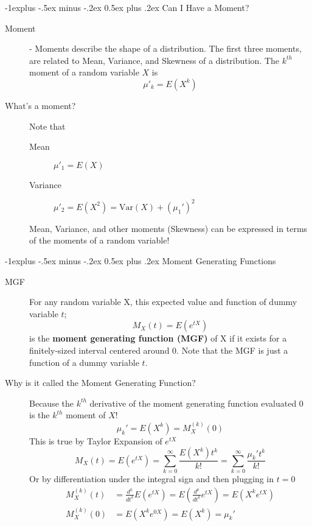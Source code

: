 \documentclass[10pt,landscape]{article}
\makeatletter
\theoremstyle{definition}
\newcommand{\var}{\textrm{Var}}
\renewcommand{\subsection}{\@startsection{subsection}{2}{0mm}%
                                {-1explus -.5ex minus -.2ex}%
                                {0.5ex plus .2ex}%
                                {\normalfont\normalsize\bfseries}}
\makeatother
\begin{document}
\begin{multicols}{3}
\subsection{Can I Have a Moment?}
\begin{description}
\item[Moment] - Moments describe the shape of a distribution. The first three moments, are related to Mean, Variance, and Skewness of a distribution. The $k^{th}$ moment of a random variable $X$ is
    \[\mu'_k = E(X^k)\]
\item[What's a moment?] Note that 
    \begin{description}
        \item[Mean] $\mu'_1 = E(X)$
        \item[Variance] $\mu'_2 = E(X^2) = \var(X) + (\mu_1')^2$
    \end{description}
    Mean, Variance, and other moments (Skewness) can be expressed in terms of the moments of a random variable!
\end{description}

\subsection{Moment Generating Functions}

\begin{description}
    \item[MGF] For any random variable X, this expected value and function of dummy variable $t$;
        \[ M_X(t) = E(e^{tX}) \]
        is the \textbf{moment generating function (MGF)} of X if it exists for a finitely-sized interval centered around 0. Note that the MGF is just a function of a dummy variable $t$.
    \item[Why is it called the Moment Generating Function?] Because the $k^{th}$ derivative of the moment generating function evaluated 0 is the $k^{th}$ moment of $X$!
    \[\mu_k' = E(X^k) = M_X^{(k)}(0)\]
    This is true by Taylor Expansion of $e^{tX}$
    \[M_X(t) = E(e^{tX}) = \sum_{k=0}^\infty \frac{E(X^k)t^k}{k!} = \sum_{k=0}^\infty \frac{\mu_k't^k}{k!} \]
    Or by differentiation under the integral sign and then plugging in $t=0$
    \begin{align*}
        M_X^{(k)}(t) &= \frac{d^k}{dt^k}E(e^{tX}) = E(\frac{d^k}{dt^k}e^{tX}) = E(X^ke^{tX}) \\
        M_X^{(k)}(0) &= E(X^ke^{0X}) = E(X^k) = \mu_k'
    \end{align*}
    

\end{description}
\end{multicols}
\end{document}
